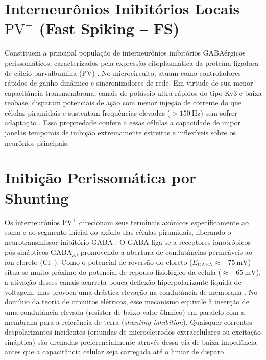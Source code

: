 \documentclass[11pt,a4paper,article,brazil]{abntex2}
\begin{document}
\begin{apendicesenv}
    \section{Interneurônios Inibitórios Locais \texorpdfstring{$\text{PV}^+$}{PV+} (Fast Spiking -- FS)}
    Constituem a principal população de interneurônios inibitórios GABAérgicos perissomáticos, caracterizados pela expressão citoplasmática da proteína ligadora de cálcio parvalbumina ($\text{PV}$) \cite{buzsaki2006, kandel2021}. No microcircuito, atuam como controladores rápidos de ganho dinâmico e sincronizadores de rede. Em virtude de sua menor capacitância transmembrana, canais de potássio ultra-rápidos do tipo Kv3 e baixa reobase, disparam potenciais de ação com menor injeção de corrente do que células piramidais e sustentam frequências elevadas ($> \qty{150}{\hertz}$) sem sofrer adaptação \cite{izhikevich2003, izhikevich2007}. Essa propriedade confere a essas células a capacidade de impor janelas temporais de inibição extremamente estreitas e inflexíveis sobre os neurônios principais.

    \section{Inibição Perissomática por Shunting}
    Os interneurônios $\text{PV}^+$ direcionam seus terminais axônicos especificamente ao soma e ao segmento inicial do axônio das células piramidais, liberando o neurotransmissor inibitório GABA \cite{buzsaki2006, kandel2021}. O GABA liga-se a receptores ionotrópicos pós-sinápticos $\text{GABA}_A$, promovendo a abertura de condutâncias permeáveis ao íon cloreto ($\text{Cl}^-$). Como o potencial de reversão do cloreto ($E_{\text{GABA}} \approx \qty{-75}{\milli\volt}$) situa-se muito próximo do potencial de repouso fisiológico da célula ($\approx \qty{-65}{\milli\volt}$), a ativação desses canais acarreta pouca deflexão hiperpolarizante líquida de voltagem, mas provoca uma drástica elevação na condutância de membrana \cite{dayan2001, gerstner2014}. No domínio da teoria de circuitos elétricos, esse mecanismo equivale à inserção de uma condutância elevada (resistor de baixo valor ôhmico) em paralelo com a membrana para a referência de terra (\emph{shunting inhibition}). Quaisquer correntes despolarizantes incidentes (oriundas de microeletrodos extracelulares ou excitação sináptica) são drenadas preferencialmente através dessa via de baixa impedância antes que a capacitância celular seja carregada até o limiar de disparo.


\end{apendicesenv}
\end{document}
